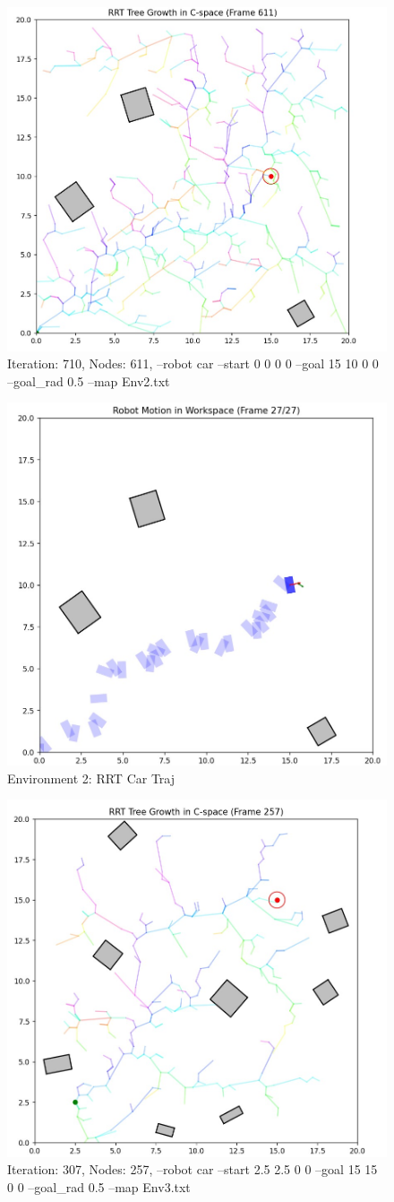 \documentclass{article}
\begin{document}
\begin{figure} [H]
    \centering
    \includegraphics[width=0.5\linewidth]{latex_media/Env2Car_rrt_grow.jpg}
    \caption{Iteration: 710, Nodes: 611, --robot car --start 0 0 0 0 --goal 15 10 0 0 --goal\_rad 0.5 --map Env2.txt}
\end{figure}

\begin{figure} [H]
    \centering
    \includegraphics[width=0.5\linewidth]{latex_media/Env2Car_rrt_traj.jpg}
    \caption{Environment 2: RRT Car Traj}
\end{figure}

\begin{figure} [H]
    \centering
    \includegraphics[width=0.5\linewidth]{latex_media/Env3Car_rrt_grow.jpg}
    \caption{Iteration: 307, Nodes: 257, --robot car --start 2.5 2.5 0 0 --goal 15 15 0 0 --goal\_rad 0.5 --map Env3.txt}
\end{figure}
\end{document}
